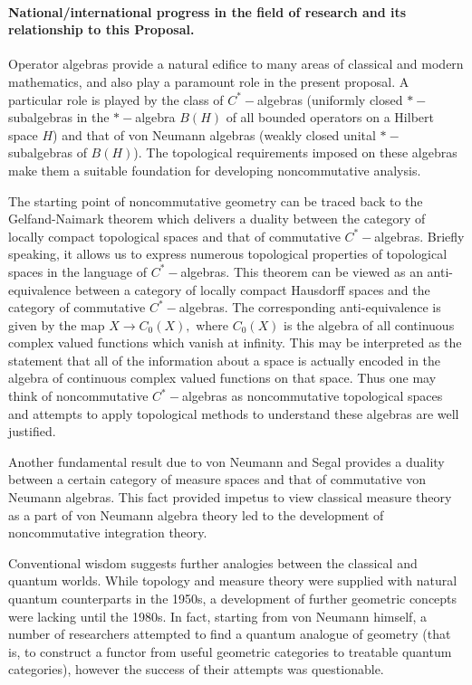 \documentclass[12pt]{article}
\begin{document}
\paragraph*{{\color{green} National/international progress in the field of research and
its relationship to this Proposal.}}

Operator algebras provide a natural edifice to many areas of classical and modern mathematics, and also play a paramount role in the present proposal. 
A particular role is played by the class of $C^{\ast}-$algebras (uniformly closed $\ast-$subalgebras in the $\ast-$algebra $B(H)$ of all bounded operators on a Hilbert space $H$) and that of von Neumann algebras (weakly closed unital $\ast-$subalgebras of $B(H)$). The topological requirements imposed on these algebras make them a suitable foundation for developing noncommutative analysis. 

The starting point of noncommutative geometry can be traced back to the Gelfand-Naimark theorem which delivers a duality between the category of locally compact topological spaces and that of commutative $C^{\ast}-$algebras. Briefly speaking, it allows us to express numerous topological properties of topological spaces in the language of $C^{\ast}-$algebras. This theorem can be viewed as an anti-equivalence between a category of locally compact Hausdorff spaces and the category of commutative $C^{\ast}-$algebras. The corresponding anti-equivalence is given by the map $X\to C_0(X),$ where $C_0(X)$ is the algebra of all continuous complex valued functions which vanish at infinity. This may be interpreted as the statement that all of the information about a space is actually encoded in the algebra of continuous complex valued functions on that space. Thus one may think of noncommutative $C^{\ast}-$algebras as noncommutative topological spaces and attempts to apply topological methods to understand these algebras are well justified. 

Another fundamental result due to von Neumann and Segal provides a duality between a certain category of measure spaces and that of commutative von Neumann algebras. This fact provided impetus to view classical measure theory as a part of von Neumann algebra theory led to the development of noncommutative integration theory.

Conventional wisdom suggests further analogies between the classical and quantum worlds. While topology and measure theory were supplied with natural quantum counterparts in the 1950s, a development of further geometric concepts were lacking until the 1980s. In fact, starting from von Neumann himself, a number of researchers attempted to find a quantum analogue of geometry (that is, to construct a functor from useful geometric categories to treatable quantum categories), however the success of their attempts was questionable.
\end{document}
